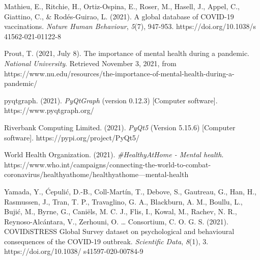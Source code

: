 \documentclass[fontsize=11pt]{article}
\begin{document}
    \hangindent=0.7cm \noindent
    Mathieu, E., Ritchie, H., Ortiz-Ospina, E., Roser, M., Hasell, J., Appel, C., Giattino, C., \& Rodés-Guirao, L. (2021). A global database of COVID-19 vaccinations. \textit{Nature Human Behaviour}, \textit{5}(7), 947-953. https://doi.org/10.1038/s\\41562-021-01122-8

    \hangindent=0.7cm \noindent
    Prout, T. (2021, July 8). The importance of mental health during a pandemic. \textit{National University}. Retrieved November 3, 2021, from https://www.nu.edu/resources/the-importance-of-mental-health-during-a-pandemic/

    \hangindent=0.7cm \noindent
    pyqtgraph. (2021). \textit{PyQtGraph} (version 0.12.3) [Computer software]. https://www.pyqtgraph.org/

    \hangindent=0.7cm \noindent
    Riverbank Computing Limited. (2021). \textit{PyQt5} (Version 5.15.6) [Computer software]. https://pypi.org/project/PyQt5/

    \hangindent=0.7cm \noindent
    World Health Organization. (2021). \textit{\#HealthyAtHome - Mental health}. https://www.who.int/campaigns/connecting-the-world-to-combat-coronavirus/healthyathome/healthyathome---mental-health

    \hangindent=0.7cm \noindent
    Yamada, Y., Ćepulić, D.-B., Coll-Martín, T., Debove, S., Gautreau, G., Han, H., Rasmussen, J., Tran, T. P., Travaglino, G. A., Blackburn, A. M., Boullu, L., Bujić, M., Byrne, G., Caniëls, M. C. J., Flis, I., Kowal, M., Rachev, N. R., Reynoso-Alcántara, V., Zerhouni, O. … Consortium, C. O. G. S. (2021). COVIDiSTRESS Global Survey dataset on psychological and behavioural consequences of the COVID-19 outbreak. \textit{Scientific Data}, \textit{8}(1), 3. https://doi.org/10.1038/ s41597-020-00784-9
\end{document}
